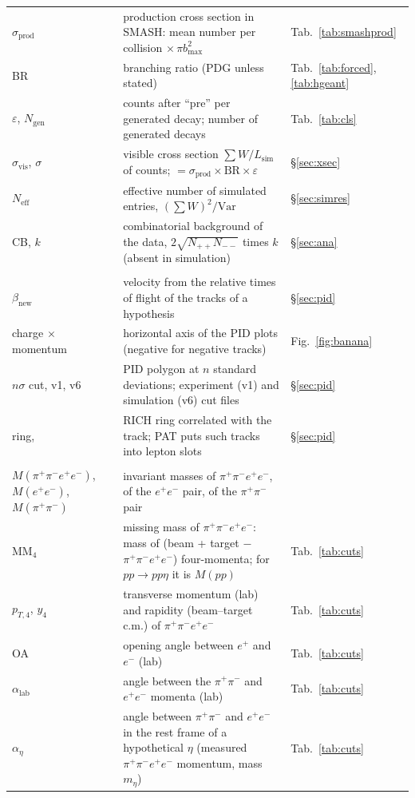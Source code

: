 \documentclass[11pt,a4paper]{article}
\newcommand{\ee}{\ensuremath{e^{+}e^{-}}\xspace}
\newcommand{\pipi}{\ensuremath{\pi^{+}\pi^{-}}\xspace}
\newcommand{\ppee}{\ensuremath{\pi^{+}\pi^{-}e^{+}e^{-}}\xspace}
\newcommand{\Mfour}{\ensuremath{M(\pi^{+}\pi^{-}e^{+}e^{-})}\xspace}
\newcommand{\Mee}{\ensuremath{M(e^{+}e^{-})}\xspace}
\newcommand{\Mpipi}{\ensuremath{M(\pi^{+}\pi^{-})}\xspace}
\newcommand{\betanew}{\ensuremath{\beta_{\mathrm{new}}}\xspace}
\newcommand{\Lsim}{\ensuremath{L_{\mathrm{sim}}}\xspace}
\newcommand{\code}[1]{\texttt{\detokenize{#1}}}
\begin{document}
{\begin{longtable}{@{}>{\raggedright\arraybackslash}p{3.0cm} >{\raggedright\arraybackslash}p{\dimexpr\textwidth-3.0cm-2.2cm-4\tabcolsep\relax} >{\raggedright\arraybackslash}p{2.2cm}@{}}
$\sigma_{\mathrm{prod}}$ & production cross section in SMASH: mean number per collision $\times\,\pi b_{\max}^2$ & Tab.~\ref{tab:smashprod} \\
BR & branching ratio (PDG unless stated) & Tab.~\ref{tab:forced}, \ref{tab:hgeant} \\
$\varepsilon$, $N_{\mathrm{gen}}$ & counts after ``pre'' per generated decay; number of generated decays & Tab.~\ref{tab:cls} \\
$\sigma_{\mathrm{vis}}$, $\sigma$ & visible cross section $\sum W/\Lsim$ of counts; $=\sigma_{\mathrm{prod}}\times\mathrm{BR}\times\varepsilon$ & \S\ref{sec:xsec} \\
$N_{\mathrm{eff}}$ & effective number of simulated entries, $(\sum W)^2/\mathrm{Var}$ & \S\ref{sec:simres} \\
CB, $k$ & combinatorial background of the data, $2\sqrt{N_{++}N_{--}}$ times $k$ (absent in simulation) & \S\ref{sec:ana} \\
\midrule
\multicolumn{3}{@{}l}{\textbf{Particle identification}} \\
$\betanew$ & velocity from the relative times of flight of the tracks of a hypothesis & \S\ref{sec:pid} \\
charge $\times$ momentum & horizontal axis of the PID plots (negative for negative tracks) & Fig.~\ref{fig:banana} \\
$n\sigma$ cut, v1, v6 & PID polygon at $n$ standard deviations; experiment (v1) and simulation (v6) cut files & \S\ref{sec:pid} \\
ring, \code{kIsLepton} & RICH ring correlated with the track; PAT puts such tracks into lepton slots & \S\ref{sec:pid} \\
\midrule
\multicolumn{3}{@{}l}{\textbf{Kinematics and cuts}} \\
\Mfour, \Mee, \Mpipi & invariant masses of \ppee, of the \ee pair, of the \pipi pair & \\
$\mathrm{MM}_4$ & missing mass of \ppee: mass of (beam + target $-$ \ppee) four-momenta; for $pp\to pp\eta$ it is $M(pp)$ & Tab.~\ref{tab:cuts} \\
$p_{T,4}$, $y_4$ & transverse momentum (lab) and rapidity (beam--target c.m.) of \ppee & Tab.~\ref{tab:cuts} \\
OA & opening angle between $e^+$ and $e^-$ (lab) & Tab.~\ref{tab:cuts} \\
$\alpha_{\mathrm{lab}}$ & angle between the \pipi and \ee momenta (lab) & Tab.~\ref{tab:cuts} \\
$\alpha_\eta$ & angle between \pipi and \ee in the rest frame of a hypothetical $\eta$ (measured \ppee momentum, mass $m_\eta$) & Tab.~\ref{tab:cuts} \\

\end{longtable}}
\end{document}
